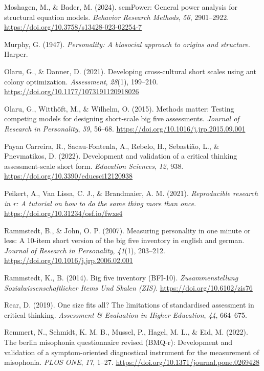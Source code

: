 \documentclass[
  12pt,
  a4paper,
  twoside]{article}
\newlength{\cslhangindent}
\newenvironment{CSLReferences}[2] %
 {\begin{list}{}{%
  \setlength{\itemindent}{0pt}
  \setlength{\leftmargin}{0pt}
  \setlength{\parsep}{0pt}
  \ifodd #1
   \setlength{\leftmargin}{\cslhangindent}
   \setlength{\itemindent}{-1\cslhangindent}
  \fi
  \setlength{\itemsep}{#2\baselineskip}}}
 {\end{list}}
\begin{document}
\begin{CSLReferences}{1}{0}
Moshagen, M., \& Bader, M. (2024). semPower: General power analysis for structural equation models. \emph{Behavior Research Methods}, \emph{56}, 2901--2922. \url{https://doi.org/10.3758/s13428-023-02254-7}

Murphy, G. (1947). \emph{Personality: A biosocial approach to origins and structure}. Harper.

Olaru, G., \& Danner, D. (2021). Developing cross-cultural short scales using ant colony optimization. \emph{Assessment}, \emph{28}(1), 199--210. \url{https://doi.org/10.1177/1073191120918026}

Olaru, G., Witthöft, M., \& Wilhelm, O. (2015). Methods matter: Testing competing models for designing short-scale big five assessments. \emph{Journal of Research in Personality}, \emph{59}, 56--68. \url{https://doi.org/10.1016/j.jrp.2015.09.001}

Payan Carreira, R., Sacau-Fontenla, A., Rebelo, H., Sebastião, L., \& Pnevmatikos, D. (2022). Development and validation of a critical thinking assessment-scale short form. \emph{Education Sciences}, \emph{12}, 938. \url{https://doi.org/10.3390/educsci12120938}

Peikert, A., Van Lissa, C. J., \& Brandmaier, A. M. (2021). \emph{Reproducible research in r: A tutorial on how to do the same thing more than once}. \url{https://doi.org/10.31234/osf.io/fwxs4}

Rammstedt, B., \& John, O. P. (2007). Measuring personality in one minute or less: A 10-item short version of the big five inventory in english and german. \emph{Journal of Research in Personality}, \emph{41}(1), 203--212. \url{https://doi.org/10.1016/j.jrp.2006.02.001}

Rammstedt, K., B. (2014). Big five inventory (BFI-10). \emph{Zusammenstellung Sozialwissenschaftlicher Items Und Skalen (ZIS)}. \url{https://doi.org/10.6102/zis76}

Rear, D. (2019). One size fits all? The limitations of standardised assessment in critical thinking. \emph{Assessment \& Evaluation in Higher Education}, \emph{44}, 664--675.

Remmert, N., Schmidt, K. M. B., Mussel, P., Hagel, M. L., \& Eid, M. (2022). The berlin misophonia questionnaire revised (BMQ-r): Development and validation of a symptom-oriented diagnostical instrument for the measurement of misophonia. \emph{PLOS ONE}, \emph{17}, 1--27. \url{https://doi.org/10.1371/journal.pone.0269428}


\end{CSLReferences}
\end{document}
